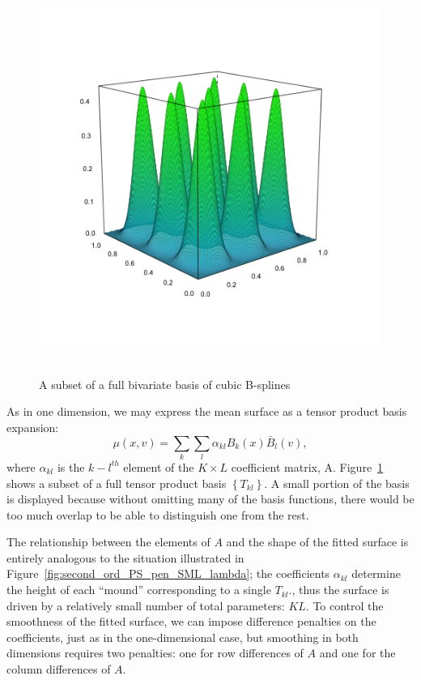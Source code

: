\documentclass[12pt]{article}
\newcommand*\needsparaphrased{\color{red}}
\theoremstyle{definition}
\begin{document}
\begin{figure}[H]
  \centering
  \graphicspath{{img/}}
  \includegraphics[width=5in,height=5in]{sparse_bicubic_basis.png}
  \caption{A subset of a full bivariate basis of cubic B-splines}\label{fig:sparse_bicubic_BS_basis}
\end{figure}


As in one dimension, we may express the mean surface as a tensor product basis expansion:
\begin{equation} \label{eq:2D_intercept_only_model_TP_expansion}
\mu\left(x,v\right) = \sum_{k}\sum_l \alpha_{kl} B_k\left(x\right) \bar{B}_l\left(v\right),
\end{equation}
where $\alpha_{kl}$ is the $k-l^{th}$ element of the $K \times L$ coefficient matrix, A. Figure~\ref{fig:sparse_bicubic_BS_basis} shows a subset of a full tensor product basis $\left\{ T_{kl} \right\}$. A small portion of the basis is displayed because without omitting many of the basis functions, there would be too much overlap to be able to distinguish one from the rest. {\needsparaphrased{[ DISCUSS HOW THE PROPERTIES OF UNIVARIATE B-SPLINES TRANSLATE TO THE $x\times v$ PLANE (i.e. compact support, evaluation of the function at any point in the domain depends on only a small number of parameters, non-negative and sum to 1, etc.)]}}


The relationship between the elements of $A$ and the shape of the fitted surface is entirely analogous to the situation illustrated in Figure~\ref{fig:second_ord_PS_pen_SML_lambda}; the coefficients $\alpha_{kl}$ determine the height of each ``mound'' corresponding to a single $T_{kl}$., thus the surface is driven by a relatively small number of total parameters: $KL$. To control the smoothness of the fitted surface, we can impose difference penalties on the coefficients, just as in the one-dimensional case, but smoothing in both dimensions requires two penalties: one for row differences of $A$ and one for the column differences of $A$.
\end{document}
